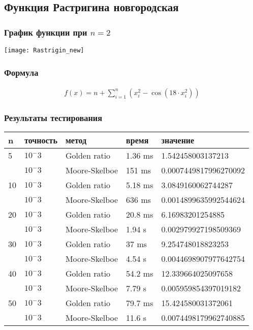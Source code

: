 \documentclass{article}
\begin{document}
    \subsection{Функция Растригина новгородская}

    \subsubsection{График функции при $n=2$}
    \texttt{[image: Rastrigin\_new]}

    \subsubsection{Формула}
    \begin{gather*}
        f(x)=n+\sum_{i=1}^n\left(x_i^2-\cos \left(18 \cdot x_i^2\right)\right)
    \end{gather*}

    \subsubsection{Результаты тестирования}

    \begin{tabular}{ |p{2cm}|p{2cm}|p{3cm}|p{2cm}|p{4cm}|  }
        \hline
        n  & точность & метод         & время   & значение              \\
        \hline
        5  & $10^-3$  & Golden ratio  & 1.36 ms & 1.542458003137213     \\\cline{2-5}
        & $10^-3$  & Moore-Skelboe & 151 ms  & 0.0007449817996270092 \\
        \hline
        10 & $10^-3$  & Golden ratio  & 5.18 ms & 3.0849160062744287    \\\cline{2-5}
        & $10^-3$  & Moore-Skelboe & 636 ms  & 0.0014899635992544624 \\
        \hline
        20 & $10^-3$  & Golden ratio  & 20.8 ms & 6.16983201254885      \\\cline{2-5}
        & $10^-3$  & Moore-Skelboe & 1.94 s  & 0.002979927198509369  \\
        \hline
        30 & $10^-3$  & Golden ratio  & 37 ms   & 9.254748018823253     \\\cline{2-5}
        & $10^-3$  & Moore-Skelboe & 4.54 s  & 0.0044698907977642754 \\
        \hline
        40 & $10^-3$  & Golden ratio  & 54.2 ms & 12.339664025097658    \\\cline{2-5}
        & $10^-3$  & Moore-Skelboe & 7.79 s  & 0.005959854397019182  \\
        \hline
        50 & $10^-3$  & Golden ratio  & 79.7 ms & 15.424580031372061    \\\cline{2-5}
        & $10^-3$  & Moore-Skelboe & 11.6 s  & 0.0074498179962740885 \\
        \hline

    \end{tabular}
\end{document}
